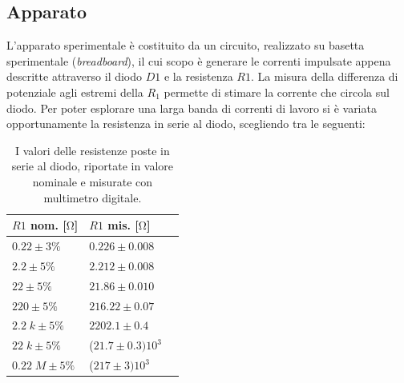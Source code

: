\documentclass{article}[a4paper, oneside, 11pt]
\begin{document}
\subsection{Apparato}
L'apparato sperimentale \`e costituito da un circuito, realizzato su basetta 
sperimentale (\emph{breadboard}), il cui scopo \`e generare le correnti
impulsate appena descritte attraverso il diodo $D1$ e la resistenza $R1$.
La misura della differenza di potenziale agli estremi della $R_1$ permette
di stimare la corrente che circola sul diodo.
Per poter esplorare una larga banda di correnti di lavoro
si \`e variata opportunamente la resistenza in serie al diodo, scegliendo tra
le seguenti:
\begin{table}[H]
\begin{center}
\begin{tabular}{lll}
	\toprule
	$R1$ nom. [$\si{\ohm}$] & $R1$ mis. [$\si{\ohm}$] \\ 
	\midrule
	\midrule
	$0.22 \pm 3 \% $         	& $0.226 \pm 0.008$ \\
	$2.2 \pm 5 \% $          	& $2.212 \pm 0.008$ \\
	$22 \pm 5 \% $           	& $21.86 \pm 0.010$ \\ 
	$220 \pm 5 \% $          	& $216.22 \pm 0.07$ \\
	$2.2\; \si{k} \pm 5 \% $       & $2202.1 \pm 0.4$ \\
	$22\; \si{k} \pm 5 \% $       & ($21.7 \pm 0.3)10^3$ \\
	$0.22\; \si{M} \pm 5 \% $      & ($217 \pm 3)10^3$ \\
	\bottomrule
\end{tabular}
\caption{I valori delle resistenze poste in serie al diodo, riportate in
	valore nominale e misurate con multimetro digitale. \label{tab: res}}
\end{center}
\end{table}
\end{document}
